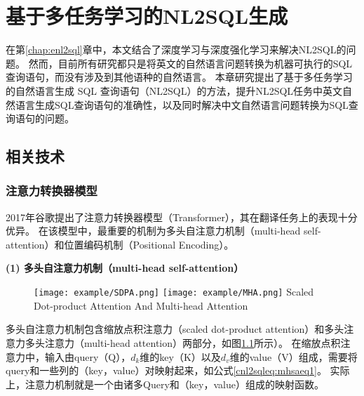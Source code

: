 
\chapter{基于多任务学习的NL2SQL生成}
\label{chap:cnl2sql}
在第\ref{chap:enl2sql}章中，本文结合了深度学习与深度强化学习来解决NL2SQL的问题。
然而，目前所有研究都只是将英文的自然语言问题转换为机器可执行的SQL查询语句，而没有涉及到其他语种的自然语言。
本章研究提出了基于多任务学习的自然语言生成 SQL 查询语句（NL2SQL）的方法，提升NL2SQL任务中英文自然语言生成SQL查询语句的准确性，以及同时解决中文自然语言问题转换为SQL查询语句的问题。


\section{相关技术}
\subsection{注意力转换器模型}

2017年谷歌提出了注意力转换器模型（Transformer）\cite{vaswani2017attention}，其在翻译任务上的表现十分优异。
在该模型中，最重要的机制为多头自注意力机制（multi-head self-attention）和位置编码机制（Positional Encoding）。

\textbf{(1) 多头自注意力机制（multi-head self-attention）}

\begin{figure}[!htp]
  \centering
  \texttt{[image: example/SDPA.png]}
  \texttt{[image: example/MHA.png]}
    {Scaled Dot-product Attention And Multi-head Attention}
  \label{fig:SDPAMHA}
\end{figure}

多头自注意力机制包含缩放点积注意力（scaled dot-product attention）和多头注意力多头注意力（multi-head attention）两部分，如图\ref{fig:SDPAMHA}所示）。
在缩放点积注意力中，输入由query（Q），$d_k$维的key（K）以及$d_v$维的value（V）组成，需要将query和一些列的（key，value）对映射起来，如公式\ref{cnl2sqleq:mhsaeq1}。
实际上，注意力机制就是一个由诸多Query和（key，value）组成的映射函数。

